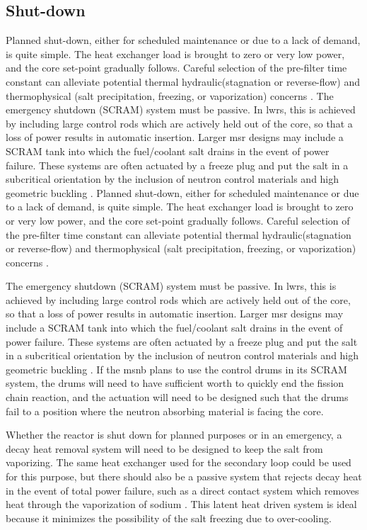 \subsection{Shut-down}
Planned shut-down, either for scheduled maintenance or due to a lack of demand, is quite simple. The heat exchanger load is brought to zero or very low power, and the core set-point gradually follows. Careful selection of the pre-filter time constant can alleviate potential thermal hydraulic(\eg stagnation or reverse-flow) and thermophysical (\eg salt precipitation, freezing, or vaporization) concerns \cite{CarterNumerical}. The emergency shutdown (\ie SCRAM) system must be passive. In \acsp{lwr}, this is achieved by including large control rods which are actively held out of the core, so that a loss of power results in automatic insertion. Larger \acs{msr} designs may include a SCRAM tank into which the fuel/coolant salt drains in the event of power failure. These systems are often actuated by a freeze plug \cite{FreezePlug} and put the salt in a subcritical orientation by the inclusion of neutron control materials \cite[Ch. 1]{Charit} and high geometric buckling \cite[Ch. 6]{Lamarsh}.
Planned shut-down, either for scheduled maintenance or due to a lack of demand, is quite simple. The heat exchanger load is brought to zero or very low power, and the core set-point gradually follows. Careful selection of the pre-filter time constant can alleviate potential thermal hydraulic(\eg stagnation or reverse-flow) and thermophysical (\eg salt precipitation, freezing, or vaporization) concerns \cite{CarterNumerical}. 

The emergency shutdown (\ie SCRAM) system must be passive. In \acsp{lwr}, this is achieved by including large control rods which are actively held out of the core, so that a loss of power results in automatic insertion. Larger \acs{msr} designs may include a SCRAM tank into which the fuel/coolant salt drains in the event of power failure. These systems are often actuated by a freeze plug \cite{FreezePlug} and put the salt in a subcritical orientation by the inclusion of neutron control materials \cite{Charit} and high geometric buckling \cite{Lamarsh}. If the \acs{msnb} plans to use the control drums in its SCRAM system, the drums will need to have sufficient worth to quickly end the fission chain reaction, and the actuation will need to be designed such that the drums fail to a position where the neutron absorbing material is facing the core. 

Whether the reactor is shut down for planned purposes or in an emergency, a decay heat \cite{TodreasKazimi1} removal system will need to be designed to keep the salt from vaporizing. The same heat exchanger used for the secondary loop could be used for this purpose, but there should also be a passive system that rejects decay heat in the event of total power failure, such as a direct contact system which removes heat through the vaporization of sodium \cite{DecayHeat}. This latent heat driven system is ideal because it minimizes the possibility of the salt freezing due to over-cooling.

